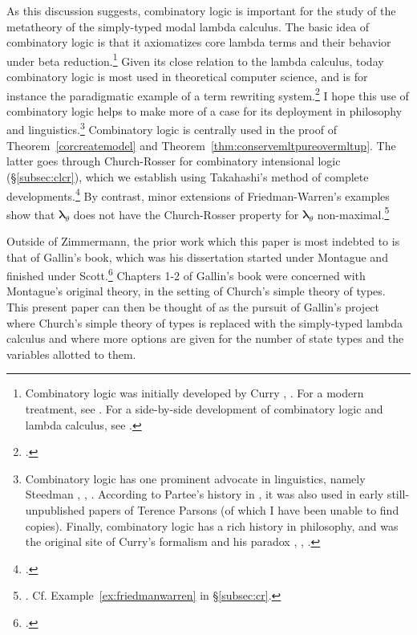 \documentclass{lmcs} %
\newcommand{\param}{\theta}
\newcommand{\mltup}{\boldsymbol\lambda_{\param}}
\begin{document}
As this discussion suggests, combinatory logic is important for the study of the metatheory of the simply-typed modal lambda calculus. The basic idea of combinatory logic is that it axiomatizes core lambda terms and their behavior under beta reduction.\footnote{Combinatory logic was initially developed by Curry \cite{Curry1958-yi}, \cite{Curry1972-tn}. For a modern treatment, see \cite{Bimbo2011-me}. For a side-by-side development of combinatory logic and lambda calculus, see \cite[Chapters 1-9]{Hindley2008-vw}.} Given its close relation to the lambda calculus, today combinatory logic is most used in theoretical computer science, and is for instance the paradigmatic example of a term rewriting system.\footnote{\cite[p. 64]{Terese2003-wa}.} I hope this use of combinatory logic helps to make more of a case for its deployment in philosophy and linguistics.\footnote{Combinatory logic has one prominent advocate in linguistics, namely Steedman \cite{Steedman1996-us}, \cite{Baldridge2011-zz}, \cite{Steedman2018-pc}. According to Partee's history in \cite[\S{3}]{Partee2012-on}, it was also used in early still-unpublished papers of Terence Parsons (of which I have been unable to find copies). Finally, combinatory logic has a rich history in philosophy, and was the original site of Curry's formalism \cite{Curry1951-pq} and his paradox \cite{Curry1942-vm}, \cite[p. 832]{Seldin2009-kc}, \cite{sep-curry-paradox}.} Combinatory logic is centrally used in the proof of Theorem~\ref{corcreatemodel} and Theorem~\ref{thm:conservemltpureovermltup}. The latter goes through Church-Rosser for combinatory intensional logic (\S\ref{subsec:clcr}), which we establish using Takahashi's method of complete developments.\footnote{\cite{Takahashi1995-kp}.} By contrast, minor extensions of Friedman-Warren's examples show that $\mltup$ does not have the Church-Rosser property for $\mltup$ non-maximal.\footnote{\cite{Friedman1980-pp}. Cf. Example~\ref{ex:friedmanwarren} in \S\ref{subsec:cr}.}

Outside of Zimmermann, the prior work which this paper is most indebted to is that of Gallin's book, which was his dissertation started under Montague and finished under Scott.\footnote{\cite{Gallin1975-tp}.} Chapters 1-2 of Gallin's book were concerned with Montague's original theory, in the setting of Church's simple theory of types. This present paper can then be thought of as the pursuit of Gallin's project where Church's simple theory of types is replaced with the simply-typed lambda calculus and where more options are given for the number of state types and the variables allotted to them. 
\end{document}
